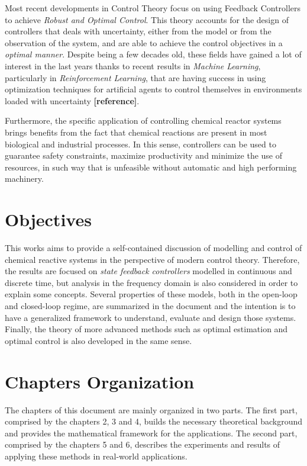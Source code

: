 \documentclass[a4paper,11pt]{book}
\numberwithin{figure}{chapter}
\numberwithin{equation}{chapter}
\numberwithin{table}{chapter}
\theoremstyle{definition}
\begin{document}
Most recent developments in Control Theory focus on using Feedback Controllers to achieve \textit{Robust and Optimal Control}. This theory accounts for the design of controllers that deals with uncertainty, either from the model or from the observation of the system, and are able to achieve the control objectives in a \textit{optimal manner}. Despite being a few decades old, these fields have gained a lot of interest in the last years thanks to recent results in \textit{Machine Learning}, particularly in \textit{Reinforcement Learning}, that are having success in using optimization techniques for artificial agents to control themselves in environments loaded with uncertainty \textbf{[reference]}.

Furthermore, the specific application of controlling chemical reactor systems brings benefits from the fact that chemical reactions are present in most biological and industrial processes. In this sense, controllers can be used to guarantee safety constraints, maximize productivity and minimize the use of resources, in such way that is unfeasible without automatic and high performing machinery.

\section{Objectives}

This works aims to provide a self-contained discussion of modelling and control of chemical reactive systems in the perspective of modern control theory. Therefore, the results are focused on \textit{state feedback controllers} modelled in continuous and discrete time, but analysis in the frequency domain is also considered in order to explain some concepts. Several properties of these models, both in the open-loop and closed-loop regime, are summarized in the document and the intention is to have a generalized framework to understand, evaluate and design those systems. Finally, the theory of more advanced methods such as optimal estimation and optimal control is also developed in the same sense.

\section{Chapters Organization}

The chapters of this document are mainly organized in two parts. The first part, comprised by the chapters 2, 3 and 4, builds the necessary theoretical background and provides the mathematical framework for the applications. The second part, comprised by the chapters 5 and 6, describes the experiments and results of applying these methods in real-world applications.
\end{document}

